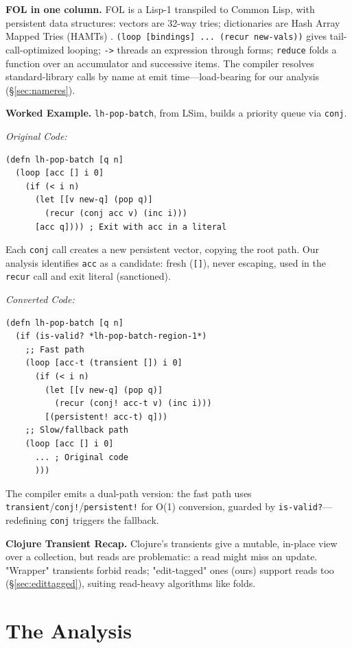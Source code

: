 \documentclass[sigplan,review,anonymous]{acmart}
\begin{document}
\textbf{FOL in one column.} FOL is a Lisp-1 transpiled to Common Lisp, with persistent data structures: vectors are 32-way tries; dictionaries are Hash Array Mapped Tries (HAMTs) \cite{bagwell2001ideal}. \texttt{(loop [bindings] ... (recur new-vals))} gives tail-call-optimized looping; \texttt{->} threads an expression through forms; \texttt{reduce} folds a function over an accumulator and successive items. The compiler resolves standard-library calls by name at emit time---load-bearing for our analysis (§\ref{sec:nameres}).

\textbf{Worked Example.} \texttt{lh-pop-batch}, from LSim, builds a priority queue via \texttt{conj}.

\emph{Original Code:}
\begin{lstlisting}
(defn lh-pop-batch [q n]
  (loop [acc [] i 0]
    (if (< i n)
      (let [[v new-q] (pop q)]
        (recur (conj acc v) (inc i)))
      [acc q]))) ; Exit with acc in a literal
\end{lstlisting}
Each \texttt{conj} call creates a new persistent vector, copying the root path. Our analysis identifies \texttt{acc} as a candidate: fresh (\texttt{[]}), never escaping, used in the \texttt{recur} call and exit literal (sanctioned).

\emph{Converted Code:}
\begin{lstlisting}
(defn lh-pop-batch [q n]
  (if (is-valid? *lh-pop-batch-region-1*)
    ;; Fast path
    (loop [acc-t (transient []) i 0]
      (if (< i n)
        (let [[v new-q] (pop q)]
          (recur (conj! acc-t v) (inc i)))
        [(persistent! acc-t) q]))
    ;; Slow/fallback path
    (loop [acc [] i 0]
      ... ; Original code
      )))
\end{lstlisting}
The compiler emits a dual-path version: the fast path uses \texttt{transient}/\texttt{conj!}/\texttt{persistent!} for O(1) conversion, guarded by \texttt{is-valid?}---redefining \texttt{conj} triggers the fallback.

\textbf{Clojure Transient Recap.} Clojure's transients give a mutable, in-place view over a collection, but reads are problematic: a read might miss an update. "Wrapper" transients forbid reads; "edit-tagged" ones (ours) support reads too (§\ref{sec:edittagged}), suiting read-heavy algorithms like folds.

\section{The Analysis}
\label{sec:analysis}
\end{document}
